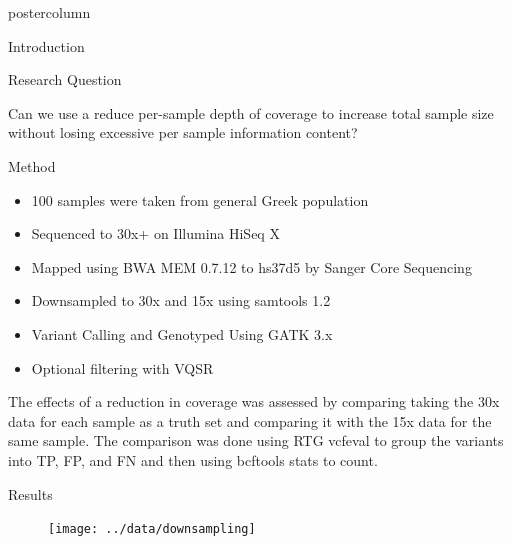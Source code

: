 \documentclass[final,xcolor=table]{beamer}
\begin{document}
\begin{frame}{}
\begin{columns}[t]
\begin{column}{.49\textwidth}
\begin{beamercolorbox}[center,wd=\textwidth]{postercolumn}
\begin{minipage}[T]{.95\textwidth}
\begin{block}{Introduction}
            \end{block}
            \begin{block}{Research Question}
\begin{figure}
\centering
{}
\end{figure}
                Can we use a reduce per-sample depth of coverage to increase total sample size without losing excessive per sample information content?
            \end{block}
            \begin{block}{Method}
                \begin{itemize} 
                    \item 100 samples were taken from general Greek population
                    \item Sequenced to 30x+ on Illumina HiSeq X
                    \item Mapped using BWA MEM 0.7.12 to hs37d5 by Sanger Core Sequencing
                    \item Downsampled to 30x and 15x using samtools 1.2
                    \item Variant Calling and Genotyped Using GATK 3.x
                    \item Optional filtering with VQSR
                \end{itemize}
                {The effects of a reduction in coverage was assessed by comparing taking the 30x data for each sample as a truth set and comparing it with the 15x data for the same sample. The comparison was done using RTG vcfeval to group the variants into TP, FP, and FN and then using bcftools stats to count.}
            \end{block}
            \begin{block}{Results}
                \begin{figure}
                \texttt{[image: ../data/downsampling]}

\end{figure}
\end{block}
\end{minipage}
\end{beamercolorbox}
\end{column}
\end{columns}
\end{frame}
\end{document}
